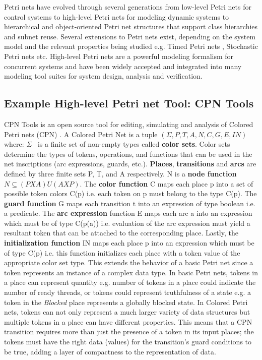 Petri nets have evolved through several generations from low-level Petri nets
for control systems \cite{reisig2012petri} to high-level Petri nets for modeling
dynamic systems \cite{jensen2012high} to hierarchical and object-oriented Petri
net structures \cite{de2001object} that support class hierarchies and subnet
reuse. Several extensions to Petri nets exist, depending on the system model and
the relevant properties being studied e.g. Timed Petri nets
\cite{wang2012timed}, Stochastic Petri nets \cite{bause1996stochastic,
marsan1994modelling} etc. High-level Petri nets are a powerful modeling
formalism for concurrent systems and have been widely accepted and integrated
into many modeling tool suites for system design, analysis and verification.

\subsection{Example High-level Petri net Tool: CPN Tools}

CPN Tools \cite{CPNTools} is an open source tool for editing, simulating and
analysis of Colored Petri nets (CPN) \cite{CPN}. A Colored Petri Net is a tuple
$(\Sigma, P, T, A, N, C, G, E, IN)$ where: $\Sigma$ ~is a finite set of
non-empty types called \textbf{color sets}. Color sets determine the types of
tokens, operations, and functions that can be used in the net inscriptions (arc
expressions, guards, etc.). \textbf{Places}, \textbf{transitions} and
\textbf{arcs} are defined by three finite sets P, T, and A respectively. N is a
\textbf{node function} $N \subseteq (P X A) U (A X P)$. The \textbf{color
function} C maps each place p into a set of possible token colors C(p) i.e. each
token on p must belong to the type C(p). The \textbf{guard function} G maps each
transition t into an expression of type boolean i.e. a predicate. The
\textbf{arc expression} function E maps each arc a into an expression which must
be of type C(p(a)) i.e. evaluation of the arc expression must yield a resultant
token that can be attached to the corresponding place. Lastly, the
\textbf{initialization function} IN maps each place p into an expression which
must be of type C(p) i.e. this function initializes each place with a token
value of the appropriate color set type. This extends the behavior of a basic
Petri net since a token represents an instance of a complex data type. In basic
Petri nets, tokens in a place can represent quantity e.g. number of tokens in a
place could indicate the number of ready threads, or tokens could represent
truthfulness of a state e.g. a token in the \emph{Blocked} place represents a
globally blocked state. In Colored Petri nets, tokens can not only represent a
much larger variety of data structures but multiple tokens in a place can have
different properties. This means that a CPN transition requires more than just
the presence of a token in its input places; the tokens must have the right data
(values) for the transition's guard conditions to be true, adding a layer of
compactness to the representation of data.

